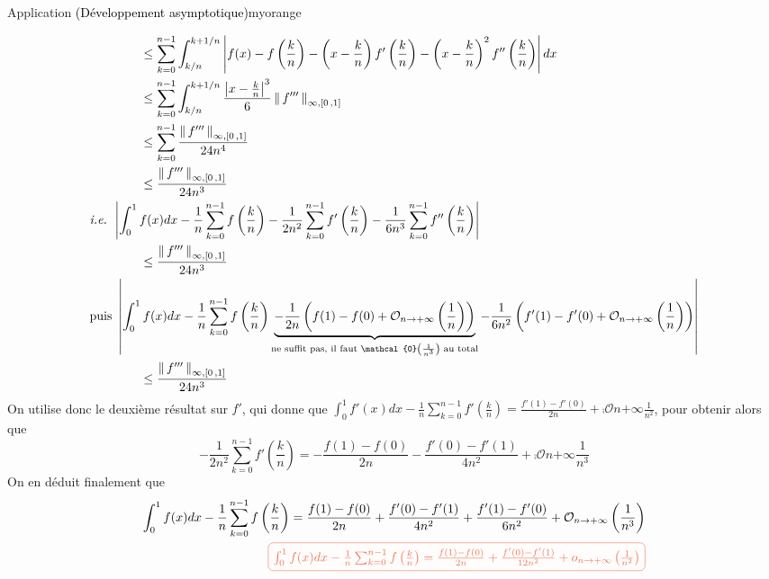 \begin{omed}{Application \textcolor{black}{(Développement asymptotique)}}{myorange}
\begin{enumerate}
\begin{align*}
                &\qquad \qquad \leq \sum_{k=0}^{n-1} \int_{k/n}^{k+1/n} \abs{f(x) - f\left(\frac{k}{n}\right) - \left(x - \frac{k}{n}\right) f'\left(\frac{k}{n}\right) - \left(x - \frac{k}{n}\right)^2 f''\left(\frac{k}{n}\right)} dx \\
                &\qquad \qquad \leq \sum_{k=0}^{n-1} \int_{k/n}^{k+1/n} \frac{\abs{x - \frac{k}{n}}^3}{6} \nnorm{\infty, \intervalleFF{0}{1}}{f'''} \\
                &\qquad \qquad \leq \sum_{k=0}^{n-1} \frac{\nnorm{\infty, \intervalleFF{0}{1}}{f'''}}{24n^4} \\
                &\qquad \qquad \leq \frac{\nnorm{\infty, \intervalleFF{0}{1}}{f'''}}{24n^3} \\
                &\textit{i.e. } \abs{\int_{0}^{1} f(x)dx - \frac{1}{n} \sum_{k=0}^{n-1} f\left(\frac{k}{n}\right) - \frac{1}{2n^2} \sum_{k=0}^{n-1}f'\left(\frac{k}{n}\right) - \frac{1}{6n^3} \sum_{k=0}^{n-1} f''\left(\frac{k}{n}\right)} \\
                &\qquad \qquad \leq \frac{\nnorm{\infty, \intervalleFF{0}{1}}{f'''}}{24n^3} \\
                &\text{puis } \abs{\int_{0}^{1} f(x)dx - \frac{1}{n} \sum_{k=0}^{n-1} f\left(\frac{k}{n}\right) \underbrace{- \frac{1}{2n} \left(f(1) - f(0) + \comp{\mathcal{O}}{n}{+\infty}{\frac{1}{n}}\right)}_{\text{ne suffit pas, il faut } \mathcal{0}\left(\frac{1}{n^3}\right) \text{ au total}} - \frac{1}{6n^2} \left(f'(1) - f'(0) + \comp{\mathcal{O}}{n}{+\infty}{\frac{1}{n}}\right)} \\
                &\qquad \qquad \leq \frac{\nnorm{\infty, \intervalleFF{0}{1}}{f'''}}{24n^3} \\
            \end{align*}
            On utilise donc le deuxième résultat sur $f'$, qui donne que $\int_{0}^{1} f'(x)dx - \frac{1}{n} \sum_{k=0}^{n-1} f'\left(\frac{k}{n}\right) = \frac{f'(1) - f'(0)}{2n} + \comp{\mathcal{O}}{n}{+\infty}{\frac{1}{n^2}}$, pour obtenir alors que 
            \[ -\frac{1}{2n^2} \sum_{k=0}^{n-1} f'\left(\frac{k}{n}\right) = - \frac{f(1) - f(0)}{2n} - \frac{f'(0) - f'(1)}{4n^2} + \comp{\mathcal{O}}{n}{+\infty}{\frac{1}{n^3}} \]   
            On en déduit finalement que 
            \begin{align*}
                \int_{0}^{1} f(x)dx - \frac{1}{n} \sum_{k=0}^{n-1} f\left(\frac{k}{n}\right) = \frac{f(1) - f(0)}{2n} + \frac{f'(0) - f'(1)}{4n^2} + \frac{f'(1) - f'(0)}{6n^2} + \comp{\mathcal{O}}{n}{+\infty}{\frac{1}{n^3}} \\
                \lilbox{myorange}{$\int_{0}^{1} f(x)dx - \frac{1}{n} \sum_{k=0}^{n-1} f\left(\frac{k}{n}\right) = \frac{f(1)- f(0)}{2n} + \frac{f'(0) - f'(1)}{12n^2} + \comp{o}{n}{+\infty}{\frac{1}{n^2}}$}
            \end{align*}
        \end{enumerate} 
    \end{omed}


